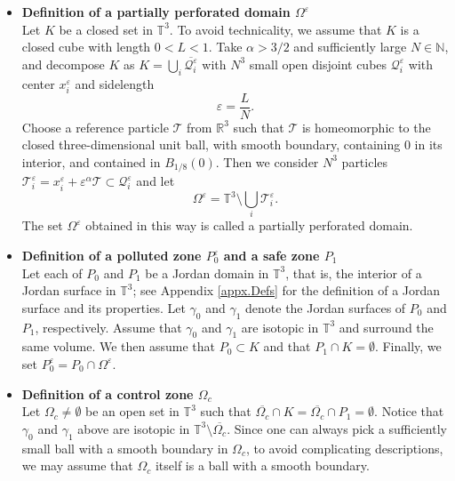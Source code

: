 \documentclass[11pt,a4paper]{article}
\numberwithin{equation}{section}
\newcommand{\N}{\mathbb{N}}
\newcommand{\R}{\mathbb{R}}
\newcommand{\T}{\mathbb{T}}
\newcommand{\eps}{\varepsilon}
\begin{document}
\begin{itemize} 
\item
\textbf{Definition of a partially perforated domain $\Omega^\eps$} \\
Let $K$ be a closed set in $\T^3$. To avoid technicality, we assume that $K$ is a closed cube with length $0<L<1$. Take $\alpha>3/2$ and sufficiently large $N\in\N$, and decompose $K$ as 
$K = \bigcup_i \overline{\mathcal{Q}^\eps_i}$ with $N^3$ small open disjoint cubes $\mathcal{Q}^\eps_i$ with center $x^\eps_i$ and sidelength 
\begin{equation}\label{def.eps}
    \eps = \frac{L}{N}. 
\end{equation}
Choose a reference particle $\mathcal{T}$ from $\R^3$ such that $\mathcal{T}$ is homeomorphic to the closed three-dimensional unit ball, with smooth boundary, containing $0$ in its interior, and contained in $B_{1/8}(0)$. Then we consider $N^3$ particles $\mathcal{T}^\eps_i = x^\eps_i + \eps^\alpha \mathcal{T} \subset \mathcal{Q}^\eps_i$ and let 
\[
    \Omega^\eps = \T^3 \setminus \bigcup_i \mathcal{T}^\eps_i. 
\]
The set $\Omega^\eps$ obtained in this way is called a partially perforated domain. 


\item
\textbf{Definition of a polluted zone $P_0^\eps$ and a safe zone $P_1$} \\
Let each of $P_0$ and $P_1$ be a Jordan domain in $\T^3$, that is, the interior of a Jordan surface in $\T^3$; see Appendix \ref{appx.Defs} for the definition of a Jordan surface and its properties. Let $\gamma_0$ and $\gamma_1$ denote the Jordan surfaces of $P_0$ and $P_1$, respectively. Assume that $\gamma_0$ and $\gamma_1$ are isotopic in $\T^3$ and surround the same volume. We then assume that $P_0 \subset K$ and that $P_1\cap K = \emptyset$. Finally, we set $P_0^\eps = P_0\cap \Omega^\eps$. 


\item
\textbf{Definition of a control zone $\Omega_c$} \\
Let $\Omega_c\neq \emptyset$ be an open set in $\T^3$ such that $\overline{\Omega_c}\cap K = \overline{\Omega_c}\cap P_1 = \emptyset$. Notice that $\gamma_0$ and $\gamma_1$ above are isotopic in $\T^3\setminus\overline{\Omega_{c}}$. Since one can always pick a sufficiently small ball with a smooth boundary in $\Omega_c$, to avoid complicating descriptions, we may assume that $\Omega_c$ itself is a ball with a smooth boundary. 
\end{itemize}
\end{document}
